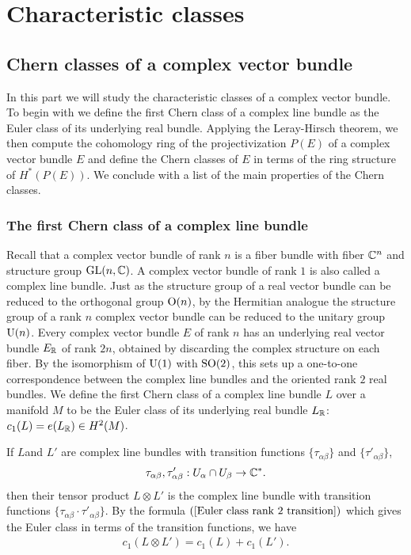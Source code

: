 \section{Characteristic classes}
\subsection{Chern classes of a complex vector bundle}
In this part we will study the characteristic classes of a complex vector bundle. To begin with we define the first Chern class of a complex line bundle as the Euler 
class of its underlying real bundle. Applying the Leray-Hirsch theorem, we then compute the cohomology ring of the projectivization $P(E)$ of a complex vector bundle $E$ 
and define the Chern classes of $E$ in terms of the ring structure of $H^*(P(E))$. We conclude with a list of the main properties of the Chern classes.
\subsubsection{The first Chern class of a complex line bundle}
Recall that a complex vector bundle of rank $n$ is a fiber bundle with fiber $\mathbb{C}^n$ and structure group $\mathrm{GL}(n,\mathbb{C})$. A complex vector bundle of rank $1$ is also called 
a complex line bundle. Just as the structure group of a real vector bundle can be reduced to the orthogonal group $\mathrm{O}(n)$, by the Hermitian analogue the structure group 
of a rank $n$ complex vector bundle can be reduced to the unitary group $\mathrm{U}(n)$. Every complex vector bundle $E$ of rank $n$ has an underlying real vector bundle $E_{\mathbb{R}}$ 
of rank $2n$, obtained by discarding the complex structure on each fiber. By the isomorphism of $\mathrm{U}(1)$ with $\mathrm{SO}(2)$, this sets up a one-to-one correspondence between 
the complex line bundles and the oriented rank $2$ real bundles. We define the first Chern class of a complex line bundle $L$ over a manifold $M$ to be the Euler class 
of its underlying real bundle $L_{\mathbb{R}}$: $c_1(L)=e(L_{\mathbb{R}})\in H^2(M)$.\par
If $L$and $L'$ are complex line bundles with transition functions $\{\tau_{\alpha\beta}\}$ and $\{\tau'_{\alpha\beta}\}$,
\[\tau_{\alpha\beta},\tau'_{\alpha\beta}:U_\alpha\cap U_\beta\to\mathbb{C}^*.\]
then their tensor product $L\otimes L'$ is the complex line bundle with transition functions $\{\tau_{\alpha\beta}\cdot\tau'_{\alpha\beta}\}$. By the formula 
$(\ref{Euler class rank 2 transition})$ which gives the Euler class in terms of the transition functions, we have
\begin{align}\label{Chern first tensor prod}
c_1(L\otimes L')=c_1(L)+c_1(L').
\end{align}

